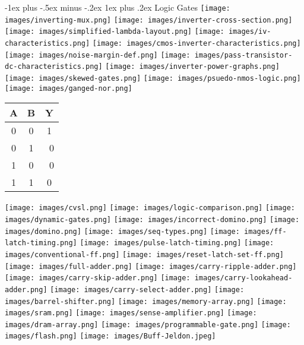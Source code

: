 \documentclass[letter,8pt,landscape]{article}
\makeatletter
\renewcommand{\subsubsection}{\@startsection{subsubsection}{3}{0mm}%
                                {-1ex plus -.5ex minus -.2ex}%
                                {1ex plus .2ex}%
                                {\normalfont\small\bfseries}}
\makeatother
\begin{document}
\begin{multicols}{3}
  \subsubsection{Logic Gates}
  \texttt{[image: images/inverting-mux.png]}
  \texttt{[image: images/inverter-cross-section.png]}
  \texttt{[image: images/simplified-lambda-layout.png]}
  \texttt{[image: images/iv-characteristics.png]}
  \texttt{[image: images/cmos-inverter-characteristics.png]}
  \texttt{[image: images/noise-margin-def.png]}
  \texttt{[image: images/pass-transistor-dc-characteristics.png]}
  \texttt{[image: images/inverter-power-graphs.png]}
  \texttt{[image: images/skewed-gates.png]}
  \texttt{[image: images/psuedo-nmos-logic.png]}
  \texttt{[image: images/ganged-nor.png]}
  \vspace*{-0.25in}
  \begin{center}
    \begin{tabular}{ |c|c|c| } 
      \hline
      A & B & Y \\
      \hline
      0 & 0 & 1 \\
      \hline
      0 & 1 & ~0 \\
      \hline
      1 & 0 & ~0 \\
      \hline
      1 & 1 & 0 \\
      \hline
    \end{tabular}
  \end{center}
  \texttt{[image: images/cvsl.png]}
  \texttt{[image: images/logic-comparison.png]}
  \texttt{[image: images/dynamic-gates.png]}
  \texttt{[image: images/incorrect-domino.png]}
  \texttt{[image: images/domino.png]}
  \texttt{[image: images/seq-types.png]}
  \texttt{[image: images/ff-latch-timing.png]}
  \texttt{[image: images/pulse-latch-timing.png]}
  \texttt{[image: images/conventional-ff.png]}
  \texttt{[image: images/reset-latch-set-ff.png]}
  \texttt{[image: images/full-adder.png]}
  \texttt{[image: images/carry-ripple-adder.png]}
  \texttt{[image: images/carry-skip-adder.png]}
  \texttt{[image: images/carry-lookahead-adder.png]}
  \texttt{[image: images/carry-select-adder.png]}
  \texttt{[image: images/barrel-shifter.png]}
  \texttt{[image: images/memory-array.png]}
  \texttt{[image: images/sram.png]}
  \texttt{[image: images/sense-amplifier.png]}
  \texttt{[image: images/dram-array.png]}
  \texttt{[image: images/programmable-gate.png]}
  \texttt{[image: images/flash.png]}
  \texttt{[image: images/Buff-Jeldon.jpeg]}
  




\end{multicols}
\end{document}
